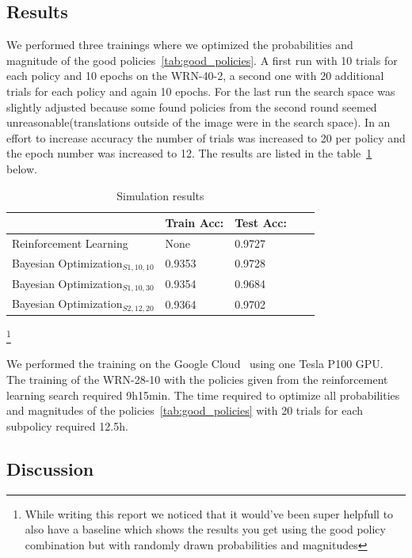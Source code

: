 \documentclass[10pt,twocolumn,letterpaper]{article}
\begin{document}
\subsection{Results}
We performed three trainings where we optimized the probabilities and magnitude of the good policies~\ref{tab:good_policies}. A first run with 10 trials for each policy and 10 epochs on the WRN-40-2, a second one with 20 additional trials for each policy and again 10 epochs. For the last run the search space was slightly adjusted because some found policies from the second round seemed unreasonable(translations outside of the image were in the search space). In an effort to increase accuracy the number of trials was increased to 20 per policy and the epoch number was increased to 12. The results are listed in the table~\ref{tab:results} below.
\begin{table}[h!]
\begin{center}
\begin{tabular}{lllll}
\hline
& Train Acc: &Test Acc: \\
\hline
Reinforcement Learning~\cite{Ekin} & None & 0.9727 \\
Bayesian Optimization$_{S1,10,10}$ & 0.9353 & 0.9728 \\
Bayesian Optimization$_{S1,10,30}$ & 0.9354 & 0.9684 \\
Bayesian Optimization$_{S2,12,20}$ & 0.9364 & 0.9702 \\
\hline
\end{tabular}
\caption {Simulation results} \label{tab:results} 
\end{center}
\end{table}\footnote{While writing this report we noticed that it would've been super helpfull to also have a baseline which shows the results you get using the good policy combination but with randomly drawn probabilities and magnitudes}

We performed the training on the Google Cloud~\cite{GCloud} using one Tesla P100 GPU. The training of the WRN-28-10 with the policies given from the reinforcement learning search required 9h15min. The time required to optimize all probabilities and magnitudes of the policies~\ref{tab:good_policies} with 20 trials for each subpolicy required 12.5h. \newline

\subsection{Discussion}
\end{document}
